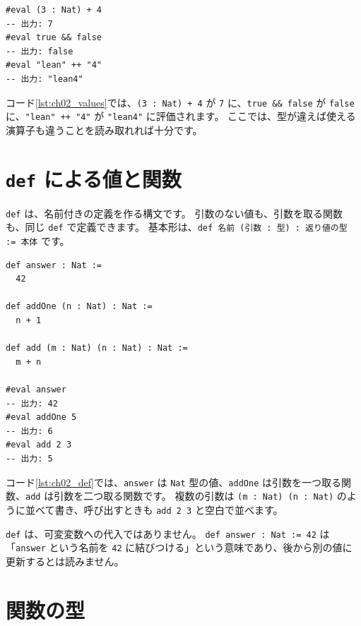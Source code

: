 \begin{listing}[htbp]
\begin{verbatim}
#eval (3 : Nat) + 4
-- 出力: 7
#eval true && false
-- 出力: false
#eval "lean" ++ "4"
-- 出力: "lean4"
\end{verbatim}
\caption{\texttt{Nat}・\texttt{Bool}・\texttt{String}}
\label{lst:ch02_values}
\end{listing}

コード\ref{lst:ch02_values}では、\texttt{(3 : Nat) + 4} が \texttt{7} に、\texttt{true \&\& false} が \texttt{false} に、\texttt{"lean" ++ "4"} が \texttt{"lean4"} に評価されます。
ここでは、型が違えば使える演算子も違うことを読み取れれば十分です。

\section{\texttt{def} による値と関数}

\texttt{def} は、名前付きの定義を作る構文です。
引数のない値も、引数を取る関数も、同じ \texttt{def} で定義できます。
基本形は、\texttt{def 名前 (引数 : 型) : 返り値の型 := 本体} です。

\begin{listing}[htbp]
\begin{verbatim}
def answer : Nat :=
  42

def addOne (n : Nat) : Nat :=
  n + 1

def add (m : Nat) (n : Nat) : Nat :=
  m + n

#eval answer
-- 出力: 42
#eval addOne 5
-- 出力: 6
#eval add 2 3
-- 出力: 5
\end{verbatim}
\caption{\texttt{answer}・\texttt{addOne}・\texttt{add}}
\label{lst:ch02_def}
\end{listing}

コード\ref{lst:ch02_def}では、\texttt{answer} は \texttt{Nat} 型の値、\texttt{addOne} は引数を一つ取る関数、\texttt{add} は引数を二つ取る関数です。
複数の引数は \texttt{(m : Nat) (n : Nat)} のように並べて書き、呼び出すときも \texttt{add 2 3} と空白で並べます。

\texttt{def} は、可変変数への代入ではありません。
\texttt{def answer : Nat := 42} は「\texttt{answer} という名前を \texttt{42} に結びつける」という意味であり、後から別の値に更新するとは読みません。

\section{関数の型}

